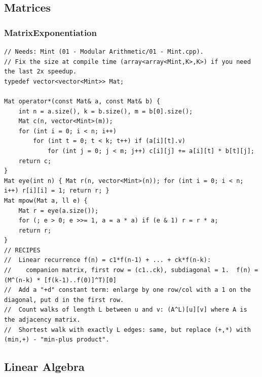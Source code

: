 \documentclass[9pt,a4paper,twocolumn]{extarticle}
\begin{document}
\subsection{Matrices}

\filbreak
\subsubsection{MatrixExponentiation}
\nopagebreak
\begin{lstlisting}
// Needs: Mint (01 - Modular Arithmetic/01 - Mint.cpp).
// Fix the size at compile time (array<array<Mint,K>,K>) if you need the last 2x speedup.
typedef vector<vector<Mint>> Mat;

Mat operator*(const Mat& a, const Mat& b) {
    int n = a.size(), k = b.size(), m = b[0].size();
    Mat c(n, vector<Mint>(m));
    for (int i = 0; i < n; i++)
        for (int t = 0; t < k; t++) if (a[i][t].v)
            for (int j = 0; j < m; j++) c[i][j] += a[i][t] * b[t][j];
    return c;
}
Mat eye(int n) { Mat r(n, vector<Mint>(n)); for (int i = 0; i < n; i++) r[i][i] = 1; return r; }
Mat mpow(Mat a, ll e) {
    Mat r = eye(a.size());
    for (; e > 0; e >>= 1, a = a * a) if (e & 1) r = r * a;
    return r;
}
// RECIPES
//  Linear recurrence f(n) = c1*f(n-1) + ... + ck*f(n-k):
//    companion matrix, first row = (c1..ck), subdiagonal = 1.  f(n) = (M^(n-k) * [f(k-1)..f(0)]^T)[0]
//  Add a "+d" constant term: enlarge by one row/col with a 1 on the diagonal, put d in the first row.
//  Count walks of length L between u and v: (A^L)[u][v] where A is the adjacency matrix.
//  Shortest walk with exactly L edges: same, but replace (+,*) with (min,+) - "min-plus product".
\end{lstlisting}

\subsection{Linear Algebra}

\filbreak
\end{document}
